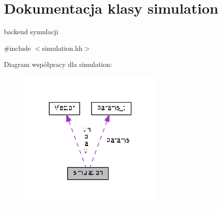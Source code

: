 \hypertarget{classsimulation}{}\section{Dokumentacja klasy simulation}
\label{classsimulation}


backend symulacji  




{\ttfamily \#include $<$simulation.\+hh$>$}



Diagram współpracy dla simulation\+:\nopagebreak
\begin{figure}[H]
\begin{center}
\leavevmode
\includegraphics[width=206pt]{classsimulation__coll__graph}
\end{center}
\end{figure}
